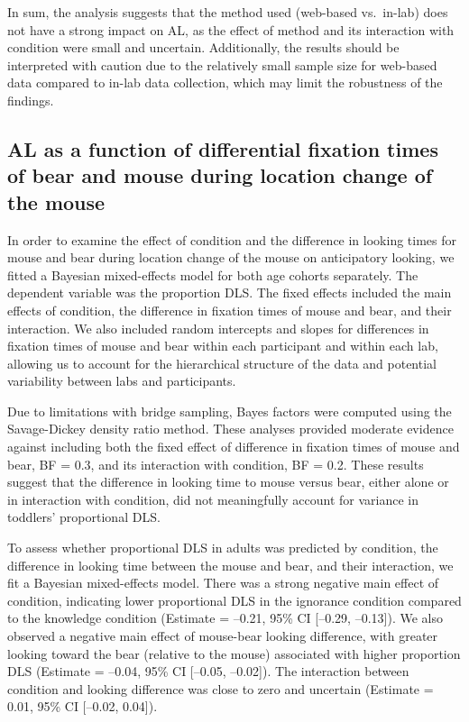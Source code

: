\documentclass[
  man, donotrepeattitle,floatsintext]{apa6}
\begin{document}
In sum, the analysis suggests that the method used (web-based vs.~in-lab) does not have a strong impact on AL, as the effect of method and its interaction with condition were small and uncertain. Additionally, the results should be interpreted with caution due to the relatively small sample size for web-based data compared to in-lab data collection, which may limit the robustness of the findings.

\subsection{AL as a function of differential fixation times of bear and mouse during location change of the mouse}\label{al-as-a-function-of-differential-fixation-times-of-bear-and-mouse-during-location-change-of-the-mouse}

In order to examine the effect of condition and the difference in looking times for mouse and bear during location change of the mouse on anticipatory looking, we fitted a Bayesian mixed-effects model for both age cohorts separately. The dependent variable was the proportion DLS. The fixed effects included the main effects of condition, the difference in fixation times of mouse and bear, and their interaction. We also included random intercepts and slopes for differences in fixation times of mouse and bear within each participant and within each lab, allowing us to account for the hierarchical structure of the data and potential variability between labs and participants.

Due to limitations with bridge sampling, Bayes factors were computed using the Savage-Dickey density ratio method. These analyses provided moderate evidence against including both the fixed effect of difference in fixation times of mouse and bear, BF = 0.3, and its interaction with condition, BF = 0.2. These results suggest that the difference in looking time to mouse versus bear, either alone or in interaction with condition, did not meaningfully account for variance in toddlers' proportional DLS.

To assess whether proportional DLS in adults was predicted by condition, the difference in looking time between the mouse and bear, and their interaction, we fit a Bayesian mixed-effects model. There was a strong negative main effect of condition, indicating lower proportional DLS in the ignorance condition compared to the knowledge condition (Estimate = --0.21, 95\% CI {[}--0.29, --0.13{]}). We also observed a negative main effect of mouse-bear looking difference, with greater looking toward the bear (relative to the mouse) associated with higher proportion DLS (Estimate = --0.04, 95\% CI {[}--0.05, --0.02{]}). The interaction between condition and looking difference was close to zero and uncertain (Estimate = 0.01, 95\% CI {[}--0.02, 0.04{]}).
\end{document}

